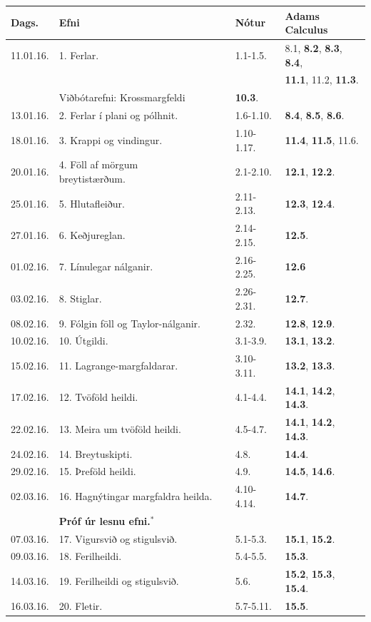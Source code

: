 \documentclass[a4paper,10pt,icelandic]{sphinxmanual}
\begin{document}
\begin{center}
\begin{tabular}{l|l|l|l}
Dags. &Efni & Nótur &Adams Calculus\\
\hline
11.01.16.&1. Ferlar.&    1.1-1.5.     &8.1, {\bf 8.2}, {\bf 8.3}, {\bf 8.4},\\
&&&{\bf 11.1}, 11.2, {\bf 11.3}.\\
&Viðbótarefni:  Krossmargfeldi& {\bf 10.3}.\\
13.01.16.&2. Ferlar í plani og pólhnit.& 1.6-1.10.& {\bf 8.4}, {\bf 8.5}, {\bf 8.6}.\\
\hline
18.01.16.&3. Krappi og vindingur.& 1.10-1.17.& {\bf 11.4}, {\bf 11.5}, 11.6.\\
20.01.16.&4. Föll af mörgum 
breytistærðum.\ \ \ \ \ \ & 2.1-2.10.& {\bf 12.1}, {\bf 12.2}.\\
\hline
25.01.16.&5. Hlutafleiður.& 2.11-2.13.&{\bf 12.3}, {\bf 12.4}.\\
27.01.16.&6. Keðjureglan.&2.14-2.15.&{\bf 12.5}.\\
\hline
01.02.16.&7. Línulegar nálganir.&2.16-2.25.&{\bf 12.6}\\
03.02.16.&8. Stiglar.&2.26-2.31.&{\bf 12.7}.\\
\hline
08.02.16.&9. Fólgin föll og Taylor-nálganir.&2.32.&{\bf 12.8}, {\bf 12.9}.\\
10.02.16.&10. Útgildi. &3.1-3.9.&{\bf 13.1}, {\bf 13.2}.\\
\hline
15.02.16.&11. Lagrange-margfaldarar. &3.10-3.11.&{\bf 13.2}, {\bf 13.3}.\\
17.02.16.&12. Tvöföld heildi. &4.1-4.4.&{\bf 14.1}, {\bf 14.2}, {\bf 14.3}.\\
\hline
22.02.16.&13. Meira um tvöföld heildi. &4.5-4.7.&{\bf 14.1}, {\bf 14.2}, {\bf 14.3}.\\
24.02.16.&14. Breytuskipti. &4.8.&{\bf 14.4}.\\
\hline
29.02.16.&15. Þreföld heildi. &4.9.& {\bf 14.5}, {\bf 14.6}.\\
02.03.16.&16. Hagnýtingar margfaldra heilda.&4.10-4.14. &{\bf 14.7}.\\
&  {\bf Próf úr  lesnu efni.$^\ast$}&\\
\hline
07.03.16.&17. Vigursvið og stigulsvið. &5.1-5.3.&{\bf 15.1}, {\bf 15.2}.\\
09.03.16.&18. Ferilheildi. & 5.4-5.5.&{\bf 15.3}. \\
\hline
14.03.16.&19. Ferilheildi og stigulsvið. &5.6.&{\bf 15.2}, {\bf 15.3}, {\bf 15.4}.\\
16.03.16.&20. Fletir. &5.7-5.11.&{\bf 15.5}. \\

\end{tabular}
\end{center}
\end{document}
